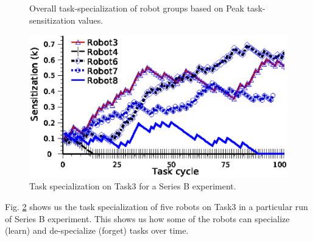 \documentclass[final,5p,times,twocolumn]{elsarticle}
\begin{document}
\begin{figure}
\centering
{}
\newline
{}
\newline
\caption{ Overall task-specialization of robot groups based on Peak task-sensitization values.}
\label{fig:task-specialization} 
\end{figure}
\begin{figure}
\centering
\includegraphics[width=\linewidth, angle=0]{images/TaskSpecialization-task3-10may-1.eps}
\caption{Task specialization on Task3 for a Series B experiment.}
\label{fig:k-single-task-SB} 
\end{figure}
Fig. \ref{fig:k-single-task-SB} shows us the task specialization of five robots on Task3 in a particular run of Series B experiment. This shows us how some of the robots can specialize (learn) and de-specialize (forget) tasks over time.
\end{document}
